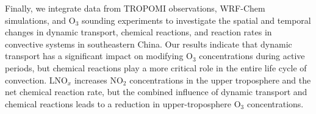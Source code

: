 {Finally, we integrate data from TROPOMI observations, WRF-Chem simulations, and O$_3$ sounding experiments to investigate the spatial and temporal changes in dynamic transport, chemical reactions, and reaction rates in convective systems in southeastern China.
Our results indicate that dynamic transport has a significant impact on modifying O$_3$ concentrations during active periods, but chemical reactions play a more critical role in the entire life cycle of convection.
LNO$_x$ increases NO$_2$ concentrations in the upper troposphere and the net chemical reaction rate,
but the combined influence of dynamic transport and chemical reactions leads to a reduction in upper-troposphere O$_3$ concentrations.
}

